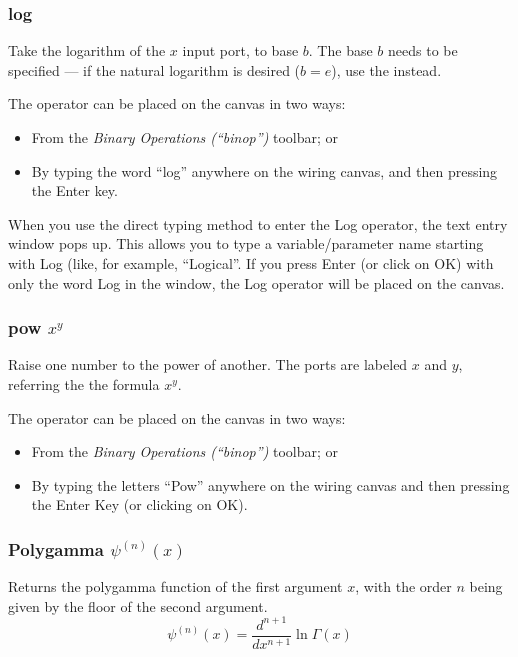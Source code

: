 \subsubsection{log}


\label{Operation:log} Take the logarithm of the $x$ input port,
to base $b$. The base $b$ needs to be specified --- if the natural
logarithm is desired ($b=e$), use the  instead.

The operator can be placed on the canvas in two ways:
\begin{itemize}
\item From the \emph{Binary Operations (``binop'')} toolbar; or 
\item By typing the word ``log'' anywhere on the wiring canvas, and then
pressing the Enter key. 
\end{itemize}
When you use the direct typing method to enter the Log operator, the
text entry window pops up. This allows you to type a variable/parameter
name starting with Log (like, for example, ``Logical''. If you press
Enter (or click on OK) with only the word Log in the window, the Log
operator will be placed on the canvas.

\subsubsection{pow $x^{y}$}


\label{Operation:pow} Raise one number to the power of another. The
ports are labeled $x$ and $y$, referring the the formula $x^{y}$.

The operator can be placed on the canvas in two ways:
\begin{itemize}
\item From the \emph{Binary Operations (``binop'')} toolbar; or 
\item By typing the letters ``Pow'' anywhere on the wiring canvas and then
pressing the Enter Key (or clicking on OK). 
\end{itemize}

\subsubsection{Polygamma $\psi^{(n)}(x)$}


\label{Operation:polygamma} Returns the polygamma function of the
first argument $x$, with the order $n$ being given by the floor
of the second argument. 
\[
\psi^{(n)}(x)=\frac{d^{n+1}}{dx^{n+1}}\ln\Gamma(x)
\]

